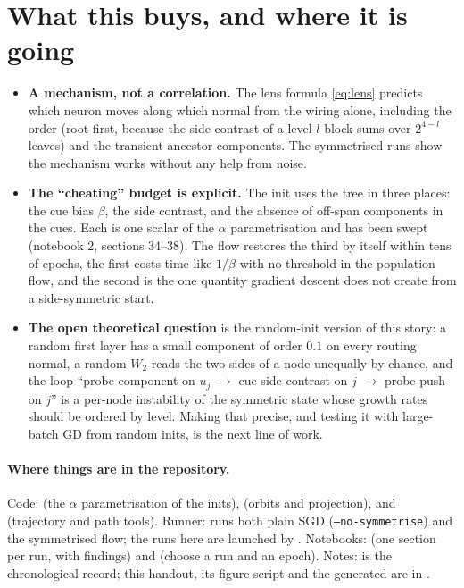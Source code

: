 \documentclass[10pt,a4paper]{article}
\begin{document}
\section{What this buys, and where it is going}
\begin{itemize}[leftmargin=1.4em,itemsep=2pt]
\item \textbf{A mechanism, not a correlation.} The lens formula \eqref{eq:lens} predicts which neuron moves along which normal from the wiring alone, including the order (root first, because the side contrast of a level-$l$ block sums over $2^{4-l}$ leaves) and the transient ancestor components. The symmetrised runs show the mechanism works without any help from noise.
\item \textbf{The ``cheating'' budget is explicit.} The init uses the tree in three places: the cue bias $\beta$, the side contrast, and the absence of off-span components in the cues. Each is one scalar of the $\alpha$ parametrisation and has been swept (notebook 2, sections 34--38). The flow restores the third by itself within tens of epochs, the first costs time like $1/\beta$ with no threshold in the population flow, and the second is the one quantity gradient descent does not create from a side-symmetric start.
\item \textbf{The open theoretical question} is the random-init version of this story: a random first layer has a small component of order $0.1$ on every routing normal, a random $W_2$ reads the two sides of a node unequally by chance, and the loop ``probe component on $u_j$ $\to$ cue side contrast on $j$ $\to$ probe push on $j$'' is a per-node instability of the symmetric state whose growth rates should be ordered by level. Making that precise, and testing it with large-batch GD from random inits, is the next line of work.
\end{itemize}

\paragraph{Where things are in the repository.}
Code:  (the $\alpha$ parametrisation of the inits),  (orbits and projection),  and  (trajectory and path tools). Runner:  runs both plain SGD (\texttt{--no-symmetrise}) and the symmetrised flow; the runs here are launched by . Notebooks:  (one section per run, with findings) and  (choose a run and an epoch). Notes:  is the chronological record; this handout, its figure script  and the generated  are in .
\end{document}
